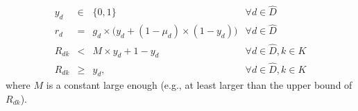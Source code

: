 \documentclass[sigconf]{acmart}
\begin{document}

\begin{equation}
\label{A-SSS2}
\begin{array}{rcll}
y_d &\in &\{0,1\} &{\forall d \in \hat{D}} \\
r_d & = & g_d \times \Big(y_d+(1-\mu_{d})\times (1-y_d)\Big) &{\forall d \in \hat{D}} \\
R_{dk}& < & M\times y_d+1-y_d &{\forall d \in \hat{D},  k\in K} \\
R_{dk}& \ge &  y_d, &{\forall d \in \hat{D},  k\in K}
\end{array}
\end{equation}
where $M$ is a constant large enough (e.g., at least larger than the upper bound of $R_{dk}$).

\end{document}
